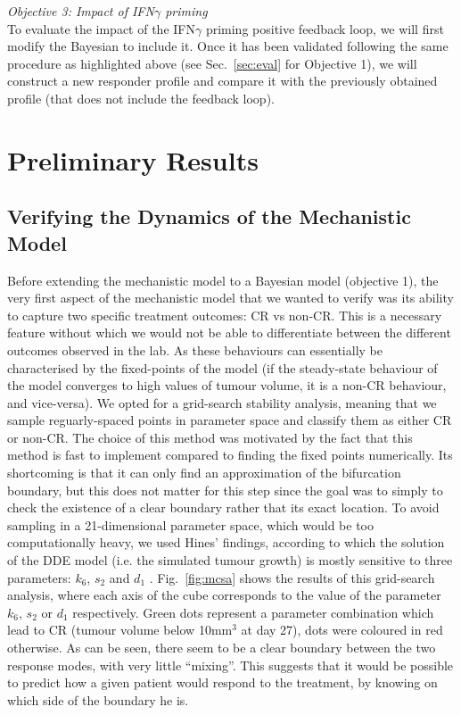 \documentclass[11pt]{article}
\begin{document}
\textit{Objective 3: Impact of IFN$\gamma$ priming}\\[3pt]
To evaluate the impact of the IFN$\gamma$ priming positive feedback loop, we will first modify the Bayesian to include it. Once it has been validated following the same procedure as highlighted above (see Sec.~\ref{sec:eval} for Objective 1), we will construct a new responder profile and compare it with the previously obtained profile (that does not include the feedback loop).

\section{Preliminary Results}

\subsection{Verifying the Dynamics of the Mechanistic Model}\label{sec:montecarloSA}

Before extending the mechanistic model to a Bayesian model (objective 1), the very first aspect of the mechanistic model that we wanted to verify was its ability to capture two specific treatment outcomes: CR vs non-CR. This is a necessary feature without which we would not be able to differentiate between the different outcomes observed in the lab. As these behaviours can essentially be characterised by the fixed-points of the model (if the steady-state behaviour of the model converges to high values of tumour volume, it is a non-CR behaviour, and vice-versa). We opted for a grid-search stability analysis, meaning that we sample reguarly-spaced points in parameter space and classify them as either CR or non-CR. The choice of this method was motivated by the fact that this method is fast to implement compared to finding the fixed points numerically. Its shortcoming is that it can only find an approximation of the bifurcation boundary, but this does not matter for this step since the goal was to simply to check the existence of a clear boundary rather that its exact location. To avoid sampling in a 21-dimensional parameter space, which would be too computationally heavy, we used Hines' findings, according to which the solution of the DDE model (i.e. the simulated tumour growth) is mostly sensitive to three parameters: $k_6$, $s_2$ and $d_1$ \cite{christian1}. Fig.~\ref{fig:mcsa} shows the results of this grid-search analysis, where each axis of the cube corresponds to the value of the parameter $k_6$, $s_2$ or $d_1$ respectively. Green dots represent a parameter combination which lead to CR (tumour volume below 10mm$^3$ at day 27), dots were coloured in red otherwise. As can be seen, there seem to be a clear boundary between the two response modes, with very little ``mixing''. This suggests that it would be possible to predict how a given patient would respond to the treatment, by knowing on which side of the boundary he is.
\end{document}

